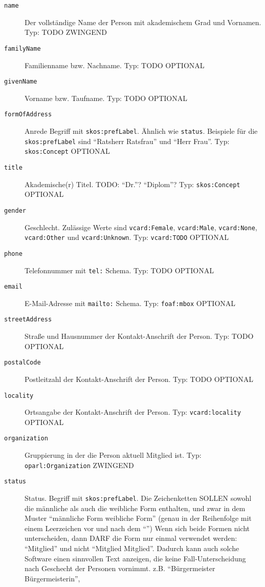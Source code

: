 \documentclass[,a4paper]{article}
\begin{document}
\begin{description}
\item[\texttt{name}]
Der vollständige Name der Person mit akademischem Grad und Vornamen.
Typ: TODO ZWINGEND
\item[\texttt{familyName}]
Familienname bzw. Nachname. Typ: TODO OPTIONAL
\item[\texttt{givenName}]
Vorname bzw. Taufname. Typ: TODO OPTIONAL
\item[\texttt{formOfAddress}]
Anrede Begriff mit \texttt{skos:prefLabel}. Ähnlich wie \texttt{status}.
Beispiele für die \texttt{skos:prefLabel} sind ``Ratsherr \textbar{}
Ratsfrau'' und ``Herr \textbar{} Frau''. Typ: \texttt{skos:Concept}
OPTIONAL
\item[\texttt{title}]
Akademische(r) Titel. TODO: ``Dr.''? ``Diplom''? Typ:
\texttt{skos:Concept} OPTIONAL
\item[\texttt{gender}]
Geschlecht. Zulässige Werte sind \texttt{vcard:Female},
\texttt{vcard:Male}, \texttt{vcard:None}, \texttt{vcard:Other} und
\texttt{vcard:Unknown}. Typ: \texttt{vcard:TODO} OPTIONAL
\item[\texttt{phone}]
Telefonnummer mit \texttt{tel:} Schema. Typ: TODO OPTIONAL
\item[\texttt{email}]
E-Mail-Adresse mit \texttt{mailto:} Schema. Typ: \texttt{foaf:mbox}
OPTIONAL
\item[\texttt{streetAddress}]
Straße und Hausnummer der Kontakt-Anschrift der Person. Typ: TODO
OPTIONAL
\item[\texttt{postalCode}]
Postleitzahl der Kontakt-Anschrift der Person. Typ: TODO OPTIONAL
\item[\texttt{locality}]
Ortsangabe der Kontakt-Anschrift der Person. Typ:
\texttt{vcard:locality} OPTIONAL
\item[\texttt{organization}]
Gruppierung in der die Person aktuell Mitglied ist. Typ:
\texttt{oparl:Organization} ZWINGEND
\item[\texttt{status}]
Status. Begriff mit \texttt{skos:prefLabel}. Die Zeichenketten SOLLEN
sowohl die männliche als auch die weibliche Form enthalten, und zwar in
dem Muster ``männliche Form \textbar{} weibliche Form'' (genau in der
Reihenfolge mit einem Leerzeichen vor und nach dem ``\textbar{}'') Wenn
sich beide Formen nicht unterscheiden, dann DARF die Form nur einmal
verwendet werden: ``Mitglied'' und nicht ``Mitglied \textbar{}
Mitglied''. Dadurch kann auch solche Software einen sinnvollen Text
anzeigen, die keine Fall-Unterscheidung nach Geschecht der Personen
vornimmt. z.B. ``Bürgermeister \textbar{} Bürgermeisterin'',

\end{description}
\end{document}
